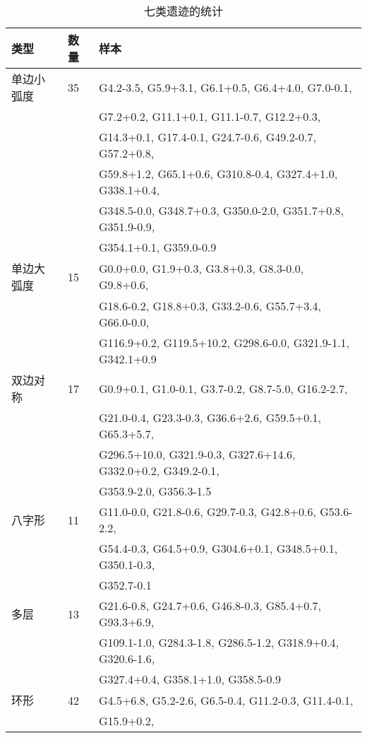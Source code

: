 \begin{table*}
  \caption{七类遗迹的统计}
  \label{table:stat}
  \centering
  \begin{tabular}{l l l}
      \hline\hline
      类型                           & 数量           & 样本               \\
      \hline
      单边小弧度         & 35                &G4.2-3.5, G5.9+3.1, G6.1+0.5, G6.4+4.0, G7.0-0.1, \\& & G7.2+0.2,
      G11.1+0.1, G11.1-0.7, G12.2+0.3,\\& &  G14.3+0.1, G17.4-0.1, G24.7-0.6, G49.2-0.7, G57.2+0.8,\\& & G59.8+1.2, G65.1+0.6,
      G310.8-0.4, G327.4+1.0, G338.1+0.4,\\& & G348.5-0.0, G348.7+0.3, G350.0-2.0, G351.7+0.8, G351.9-0.9,\\& &  G354.1+0.1,
      G359.0-0.9\\
      \hline
      单边大弧度         & 15                &G0.0+0.0, G1.9+0.3, G3.8+0.3, G8.3-0.0, G9.8+0.6,\\& & G18.6-0.2,
      G18.8+0.3, G33.2-0.6,  G55.7+3.4, G66.0-0.0,\\& & G116.9+0.2, G119.5+10.2, G298.6-0.0, G321.9-1.1, G342.1+0.9\\
      \hline
      双边对称             & 17                &G0.9+0.1, G1.0-0.1, G3.7-0.2, G8.7-5.0, G16.2-2.7,\\& & G21.0-0.4,
      G23.3-0.3,  G36.6+2.6,  G59.5+0.1,  G65.3+5.7, \\& & G296.5+10.0, G321.9-0.3, G327.6+14.6, G332.0+0.2, G349.2-0.1,
      \\& & G353.9-2.0, G356.3-1.5\\
      \hline
      八字形            & 11                &G11.0-0.0, G21.8-0.6, G29.7-0.3, G42.8+0.6, G53.6-2.2, \\& & G54.4-0.3,
      G64.5+0.9,  G304.6+0.1, G348.5+0.1, G350.1-0.3, \\& & G352.7-0.1\\
      \hline
      多层                     & 13                &G21.6-0.8, G24.7+0.6, G46.8-0.3, G85.4+0.7, G93.3+6.9, \\& & G109.1-1.0,
       G284.3-1.8,  G286.5-1.2,  G318.9+0.4, G320.6-1.6,\\& & G327.4+0.4, G358.1+1.0, G358.5-0.9\\
      \hline
      环形                        & 42                &G4.5+6.8, G5.2-2.6, G6.5-0.4, G11.2-0.3, G11.4-0.1, \\& & G15.9+0.2,

\end{tabular}
\end{table*}
